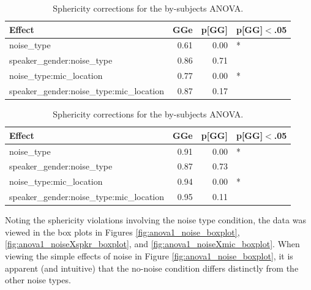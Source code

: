 \documentclass[dissertation,copyright]{uathesis}
\begin{document}
\begin{table}[ht]
\centering
\begin{tabular}{lrrl}
  \hline
Effect & GGe & p[GG] & p[GG]$<$.05 \\ 
  \hline
noise\_type & 0.61 & 0.00 & * \\ 
  speaker\_gender:noise\_type & 0.86 & 0.71 &  \\ 
  noise\_type:mic\_location & 0.77 & 0.00 & * \\ 
  speaker\_gender:noise\_type:mic\_location & 0.87 & 0.17 &  \\ 
   \hline
\end{tabular}
\caption{Sphericity corrections for the by-subjects ANOVA.} 
\label{tab:anova1_subj_sph_corr}
\end{table}
\begin{table}[ht]
\centering
\begin{tabular}{lrrl}
  \hline
Effect & GGe & p[GG] & p[GG]$<$.05 \\ 
  \hline
noise\_type & 0.91 & 0.00 & * \\ 
  speaker\_gender:noise\_type & 0.87 & 0.73 &  \\ 
  noise\_type:mic\_location & 0.94 & 0.00 & * \\ 
  speaker\_gender:noise\_type:mic\_location & 0.95 & 0.11 &  \\ 
   \hline
\end{tabular}
\caption{Sphericity corrections for the by-subjects ANOVA.} 
\label{tab:anova1_item_sph_corr}
\end{table}

Noting the sphericity violations involving the noise type condition, the data was viewed in the box plots in Figures \ref{fig:anova1_noise_boxplot}, \ref{fig:anova1_noiseXspkr_boxplot}, and \ref{fig:anova1_noiseXmic_boxplot}.
When viewing the simple effects of noise in Figure \ref{fig:anova1_noise_boxplot}, it is apparent (and intuitive) that the no-noise condition differs distinctly from the other noise types.
\end{document}
